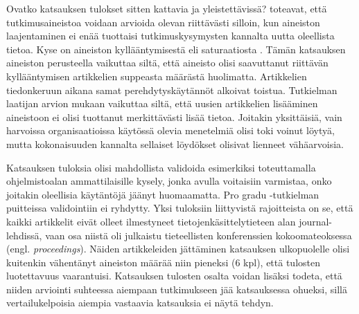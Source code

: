 \documentclass[utf8]{gradu3}
\begin{document}
Ovatko katsauksen tulokset sitten kattavia ja yleistettävissä? \textcite{eskola-suoranta-1998} toteavat, että tutkimusaineistoa voidaan arvioida olevan riittävästi silloin, kun aineiston laajentaminen ei enää tuottaisi tutkimuskysymysten kannalta uutta oleellista tietoa. Kyse on aineiston kyllääntymisestä eli saturaatiosta \parencite{eskola-suoranta-1998}. Tämän katsauksen aineiston perusteella vaikuttaa siltä, että aineisto olisi saavuttanut riittävän kyllääntymisen artikkelien suppeasta määrästä huolimatta. Artikkelien tiedonkeruun aikana samat perehdytyskäytännöt alkoivat toistua. Tutkielman laatijan arvion mukaan vaikuttaa siltä, että uusien artikkelien lisääminen aineistoon ei olisi tuottanut merkittävästi lisää tietoa. Joitakin yksittäisiä, vain harvoissa organisaatioissa käytössä olevia menetelmiä olisi toki voinut löytyä, mutta kokonaisuuden kannalta sellaiset löydökset olisivat lienneet vähäarvoisia.

Katsauksen tuloksia olisi mahdollista validoida esimerkiksi toteuttamalla ohjelmistoalan ammattilaisille kysely, jonka avulla voitaisiin varmistaa, onko joitakin oleellisia käytäntöjä jäänyt huomaamatta. Pro gradu -tutkielman puitteissa validointiin ei ryhdytty. Yksi tuloksiin liittyvistä rajoitteista on se, että kaikki artikkelit eivät olleet ilmestyneet tietojenkäsittelytieteen alan journal-lehdissä, vaan osa niistä oli julkaistu tieteellisten konferenssien kokoomateoksessa (engl. \textit{proceedings}). Näiden artikkeleiden jättäminen katsauksen ulkopuolelle olisi kuitenkin vähentänyt aineiston määrää niin pieneksi (6 kpl), että tulosten luotettavuus vaarantuisi. Katsauksen tulosten osalta voidan lisäksi todeta, että niiden arviointi suhteessa aiempaan tutkimukseen jää katsauksessa ohueksi, sillä vertailukelpoisia aiempia vastaavia katsauksia ei näytä tehdyn.
\end{document}
